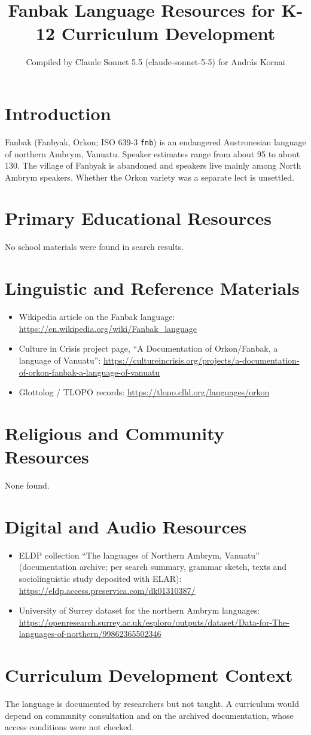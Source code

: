\documentclass[12pt]{article}
\title{Fanbak Language Resources for K-12 Curriculum Development}
\author{Compiled by Claude Sonnet 5.5 (claude-sonnet-5-5) for Andr\'as Kornai}
\date{}
\begin{document}
\maketitle

\section{Introduction}
Fanbak (Fanbyak, Orkon; ISO 639-3 \texttt{fnb}) is an endangered Austronesian language of northern Ambrym, Vanuatu. Speaker estimates range from about 95 to about 130. The village of Fanbyak is abandoned and speakers live mainly among North Ambrym speakers. Whether the Orkon variety was a separate lect is unsettled.

\section{Primary Educational Resources}
No school materials were found in search results.

\section{Linguistic and Reference Materials}
\begin{itemize}
\item Wikipedia article on the Fanbak language: \url{https://en.wikipedia.org/wiki/Fanbak_language}
\item Culture in Crisis project page, ``A Documentation of Orkon/Fanbak, a language of Vanuatu'': \url{https://cultureincrisis.org/projects/a-documentation-of-orkon-fanbak-a-language-of-vanuatu}
\item Glottolog / TLOPO records: \url{https://tlopo.clld.org/languages/orkon}
\end{itemize}

\section{Religious and Community Resources}
None found.

\section{Digital and Audio Resources}
\begin{itemize}
\item ELDP collection ``The languages of Northern Ambrym, Vanuatu'' (documentation archive; per search summary, grammar sketch, texts and sociolinguistic study deposited with ELAR): \url{https://eldp.access.preservica.com/dk01310387/}
\item University of Surrey dataset for the northern Ambrym languages: \url{https://openresearch.surrey.ac.uk/esploro/outputs/dataset/Data-for-The-languages-of-northern/99862365502346}
\end{itemize}

\section{Curriculum Development Context}
The language is documented by researchers but not taught. A curriculum would depend on community consultation and on the archived documentation, whose access conditions were not checked.
\end{document}
